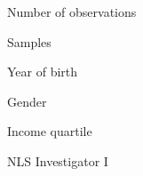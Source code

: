 \begin{frame}\begin{figure}[htp]\centering
\caption{Number of observations}
\end{figure}\end{frame}
\begin{frame}\begin{figure}[htp]\centering
\caption{Samples}
\end{figure}\end{frame}
\begin{frame}\begin{figure}[htp]\centering
\caption{Year of birth}
\end{figure}\end{frame}
\begin{frame}\begin{figure}[htp]\centering
\caption{Gender}
\end{figure}\end{frame}
\begin{frame}\begin{figure}[htp]\centering
\caption{Income quartile}
\end{figure}\end{frame}
\begin{frame}\begin{figure}[htp]\centering
\caption{NLS Investigator I}
\end{figure}\end{frame}

